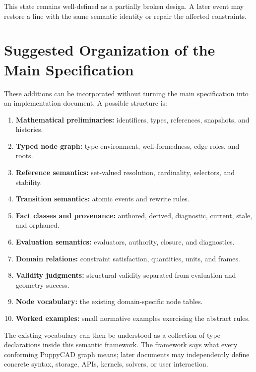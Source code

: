\documentclass[11pt]{article}
\begin{document}
This state remains well-defined as a partially broken design. A later event may
restore a line with the same semantic identity or repair the affected
constraints.

\section{Suggested Organization of the Main Specification}

These additions can be incorporated without turning the main specification
into an implementation document. A possible structure is:

\begin{enumerate}
  \item \textbf{Mathematical preliminaries:} identifiers, types, references,
    snapshots, and histories.
  \item \textbf{Typed node graph:} type environment, well-formedness, edge
    roles, and roots.
  \item \textbf{Reference semantics:} set-valued resolution, cardinality,
    selectors, and stability.
  \item \textbf{Transition semantics:} atomic events and rewrite rules.
  \item \textbf{Fact classes and provenance:} authored, derived, diagnostic,
    current, stale, and orphaned.
  \item \textbf{Evaluation semantics:} evaluators, authority, closure, and
    diagnostics.
  \item \textbf{Domain relations:} constraint satisfaction, quantities, units,
    and frames.
  \item \textbf{Validity judgments:} structural validity separated from
    evaluation and geometry success.
  \item \textbf{Node vocabulary:} the existing domain-specific node tables.
  \item \textbf{Worked examples:} small normative examples exercising the
    abstract rules.
\end{enumerate}

The existing vocabulary can then be understood as a collection of type
declarations inside this semantic framework. The framework says what every
conforming PuppyCAD graph means; later documents may independently define
concrete syntax, storage, APIs, kernels, solvers, or user interaction.
\end{document}
